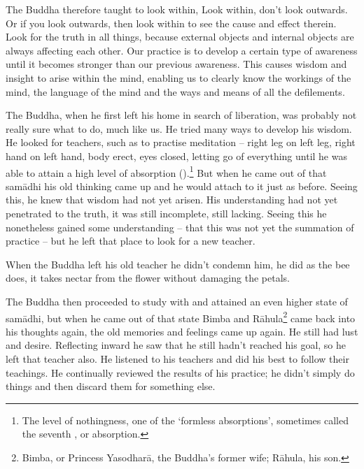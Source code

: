 The Buddha therefore taught to look within,  Look within, don't look outwards. Or if you look outwards, then look within to see the cause and effect therein. Look for the truth in all things, because external objects and internal objects are always affecting each other. Our practice is to develop a certain type of awareness until it becomes stronger than our previous awareness. This causes wisdom and insight to arise within the mind, enabling us to clearly know the workings of the mind, the language of the mind and the ways and means of all the defilements. 

The Buddha, when he first left his home in search of liberation, was probably not really sure what to do, much like us. He tried many ways to develop his wisdom. He looked for teachers, such as  to practise meditation -- right leg on left leg, right hand on left hand, body erect, eyes closed, letting go of everything until he was able to attain a high level of absorption ().\footnote{The level of nothingness, one of the `formless absorptions', sometimes called the seventh , or absorption.} But when he came out of that sam\=adhi his old thinking came up and he would attach to it just as before. Seeing this, he knew that wisdom had not yet arisen. His understanding had not yet penetrated to the truth, it was still incomplete, still lacking. Seeing this he nonetheless gained some understanding -- that this was not yet the summation of practice -- but he left that place to look for a new teacher. 

When the Buddha left his old teacher he didn't condemn him, he did as the bee does, it takes nectar from the flower without damaging the petals. 

The Buddha then proceeded to study with  and attained an even higher state of sam\=adhi, but when he came out of that state Bimba and R\=ahula\footnote{Bimba, or Princess Yasodhar\=a, the Buddha's former wife; R\=ahula, his son.} came back into his thoughts again, the old memories and feelings came up again. He still had lust and desire. Reflecting inward he saw that he still hadn't reached his goal, so he left that teacher also. He listened to his teachers and did his best to follow their teachings. He continually reviewed the results of his practice; he didn't simply do things and then discard them for something else. 

